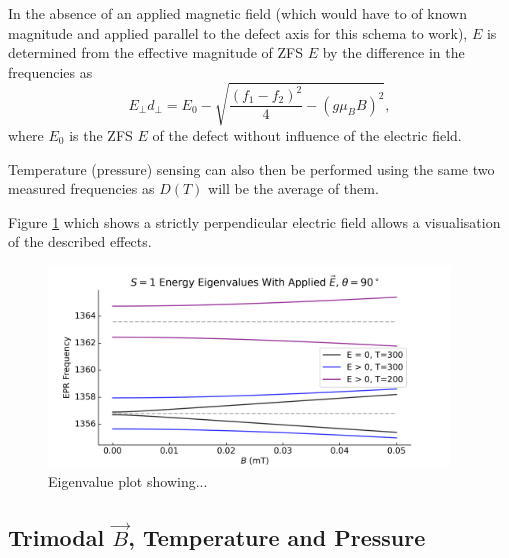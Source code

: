 In the absence of an applied magnetic field (which would have to of known magnitude and applied parallel to the defect axis for this schema to work), $E$ is determined from the effective magnitude of ZFS $E$ by the difference in the frequencies as
\begin{equation}
    E_\perp d_\perp = E_0 - \sqrt{\frac{(f_1 - f_2)^2}{4} - (g \mu_B B)^2}, 
    \label{eq:multi-E+T}
\end{equation}
where $E_0$ is the ZFS $E$ of the defect without influence of the electric field. 

Temperature (pressure) sensing can also then be performed using the same two measured frequencies as $D(T)$ will be the average of them. 

Figure \ref{fig:E_Field_perp_temp} which shows a strictly perpendicular electric field allows a visualisation of the described effects.  
\begin{figure}[H]
    \begin{center}
        \includegraphics[width=0.95\textwidth]{figures/EFieldPerpTemp.png}
    \end{center}
    \caption{Eigenvalue plot showing... }\label{fig:E_Field_perp_temp}
\end{figure}



\subsection{Trimodal $\vec{B}$, Temperature and Pressure}

